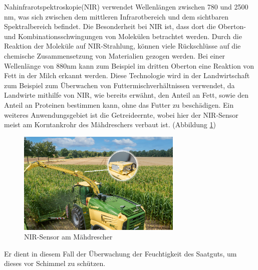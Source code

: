 Nahinfrarotspektroskopie(NIR) verwendet Wellenlängen zwischen 780 und 2500 nm,
was sich zwischen dem mittleren Infrarotbereich und dem sichtbaren
Spektralbereich befindet. Die Besonderheit bei NIR ist, dass dort die
Oberton-und Kombinationsschwingungen von Molekülen betrachtet werden.
\cite{shenk2001application} Durch die Reaktion der Moleküle auf NIR-Strahlung,
können viele Rückschlüsse auf die chemische Zusammensetzung von Materialien
gezogen werden. Bei einer Wellenlänge von 880nm kann zum Beispiel im dritten
Oberton eine Reaktion von Fett in der Milch erkannt werden. \cite{cen2007theory}
Diese Technologie wird in der Landwirtschaft zum Beispiel zum Überwachen von
Futtermischverhältnissen verwendet, da Landwirte mithilfe von NIR, wie bereits
erwähnt, den Anteil an Fett, sowie den Anteil an Proteinen bestimmen kann, ohne
das Futter zu beschädigen. Ein weiteres Anwendungsgebiet ist die Getreideernte,
wobei hier der NIR-Sensor meist am Korntankrohr des Mähdreschers verbaut ist.
(Abbildung \ref{fig:Mähhdrescher NIR-Sensor}) 

\begin{figure}[ht]
	\centering
	\includegraphics[width=0.7\textwidth]{bilder/Krone NIR Control dual.jpg}
	\caption[Mähhdrescher mit NIR-Sensor]{NIR-Sensor am Mähdrescher \cite{Krone}}
	\label{fig:Mähhdrescher NIR-Sensor}
\end{figure}

Er dient in diesem Fall der Überwachung der Feuchtigkeit des Saatguts,
um dieses vor Schimmel zu schützen.
